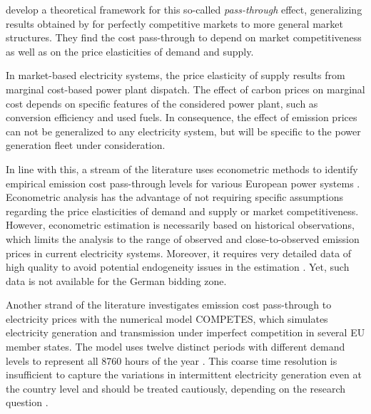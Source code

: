\documentclass[preprint, 12pt, authoryear]{elsarticle}
\begin{document}
\citet{Weyl2013} develop a theoretical framework for this so-called \emph{pass-through} effect, generalizing results obtained by \citet{Jenkin1872} for perfectly competitive markets to more general market structures. 
They find the cost pass-through to depend on market competitiveness as well as on the price elasticities of demand and supply.
 
In market-based electricity systems, the price elasticity of supply results from marginal cost-based power plant dispatch. 
The effect of carbon prices on marginal cost depends on specific features of the considered power plant, such as conversion efficiency and used fuels.
In consequence, the effect of emission prices can not be generalized to any electricity system, but will be specific to the power generation fleet under consideration.

In line with this, a stream of the literature uses econometric methods to identify empirical emission cost pass-through levels for various European power systems \citep[e.g.][]{Sijm2006, Honkatukia2006, Zachmann2008, Fabra2014, Hintermann2016}. 
Econometric analysis has the advantage of not requiring specific assumptions regarding the price elasticities of demand and supply or market competitiveness.
However, econometric estimation is necessarily based on historical observations, which limits the analysis to the range of observed and close-to-observed emission prices in current electricity systems. Moreover, it requires very detailed data of high quality to avoid potential endogeneity issues in the estimation \citep[c.f.][]{Fabra2014, Hintermann2016}. Yet, such data is not available for the German bidding zone.

Another strand of the literature \citep{Sijm2006, Chen2008, Lise2010} investigates emission cost pass-through to electricity prices with the numerical model COMPETES, which simulates electricity generation and transmission under imperfect competition in several EU member states.
The model uses twelve distinct periods with different demand levels to represent all 8760 hours of the year \citep{Sijm2005}. 
This coarse time resolution is insufficient to capture the variations in intermittent electricity generation even at the country level \citep{Ernst1999} and should be treated cautiously, depending on the research question \citep{Pfenninger2017}.
\end{document}
